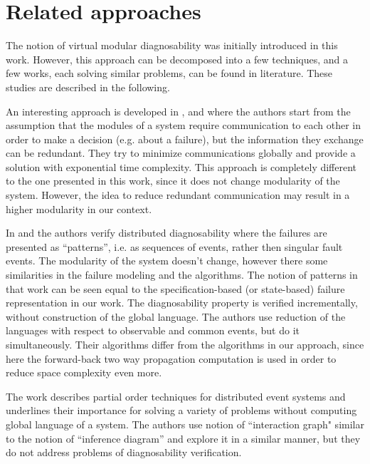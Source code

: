 \section{Related approaches}

The notion of virtual modular diagnosability was initially introduced in this
work. However, this approach can be decomposed into a few techniques, and a
few works, each solving similar problems, can be found in literature. These
studies are described in the following.

An interesting approach is developed in \cite{rudie_minimal_1999},
\cite{rudie_minimal_2003} and \cite{lin_minimal_2007} where the authors start
from the assumption that the modules of a system require communication to each
other in order to make a decision (e.g. about a failure), but the information
they exchange can be redundant. They try to minimize communications globally and
provide a solution with exponential time complexity. This approach is
completely different to the one presented in this work, since it does not change
modularity of the system. However, the idea to reduce redundant communication
may result in a higher modularity in our context.

In \cite{ye_incremental_2009} and \cite{ye_general_2012} the authors verify
distributed diagnosability where the failures are presented as ``patterns'',
i.e. as sequences of events, rather then singular fault events. 
The modularity of the system doesn't change, however there some similarities
in the failure modeling and the algorithms. The notion
of patterns in that work can be seen equal to the specification-based (or
state-based) failure representation in our work. The diagnosability property is
verified incrementally, without construction of the global language. The authors
use reduction of the languages with respect to observable and common events, but
do it simultaneously. Their algorithms differ from the algorithms in our
approach, since here the forward-back two way propagation computation is used in
order to reduce space complexity even more.

The work \cite{fabre_partial_2007} describes partial order techniques for
distributed event systems and underlines their importance for solving
a variety of problems without computing global language of a system. The
authors use notion of ``interaction graph" similar to the notion of ``inference
diagram'' and explore it in a similar manner, but they do not address problems
of diagnosability verification.  
 

